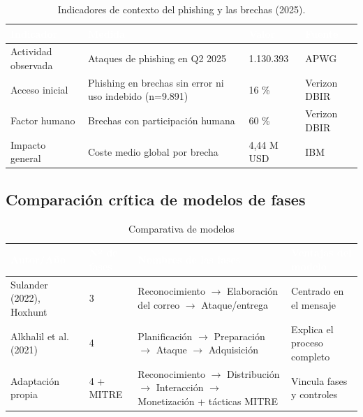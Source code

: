 \documentclass[11pt,a4paper,oneside]{report}
\begin{document}
\begingroup
\begin{table}[H]
  \centering
  \small
  \caption{Indicadores de contexto del phishing y las brechas (2025).}
  \label{tab:2-1}
  \begin{tabularx}{\textwidth}{|X|X|X|X|}
    \hline
    \rowcolor{uemcgreen}
    \textcolor{white}{\textbf{Indicador}} & \textcolor{white}{\textbf{Medida}} & \textcolor{white}{\textbf{Valor}} & \textcolor{white}{\textbf{Fuente}} \\
    \hline
    Actividad observada & Ataques de phishing en Q2 2025 & 1.130.393 & APWG \\
    \hline
    \rowcolor{tablelight}
    Acceso inicial & Phishing en brechas sin error ni uso indebido (n=9.891) & 16 \% & Verizon DBIR \\
    \hline
    Factor humano & Brechas con participación humana & 60 \% & Verizon DBIR \\
    \hline
    \rowcolor{tablelight}
    Impacto general & Coste medio global por brecha & 4,44 M USD & IBM \\
    \hline
  \end{tabularx}
\end{table}
\endgroup

\subsection{Comparación crítica de modelos de fases}

\begingroup
\begin{table}[H]
  \centering
  \small
  \caption{Comparativa de modelos}
  \label{tab:2-2}
  \begin{tabularx}{\textwidth}{|X|X|X|X|}
    \hline
    \rowcolor{uemcgreen}
    \textcolor{white}{\textbf{Autor/Año}} & \textcolor{white}{\textbf{Nº de fases}} & \textcolor{white}{\textbf{Nombres de las fases}} & \textcolor{white}{\textbf{Ventajas del modelo}} \\
    \hline
    Sulander (2022), Hoxhunt & 3 & Reconocimiento \(\rightarrow\) Elaboración del correo \(\rightarrow\) Ataque/entrega & Centrado en el mensaje \\
    \hline
    \rowcolor{tablelight}
    Alkhalil et al. (2021) & 4 & Planificación \(\rightarrow\) Preparación \(\rightarrow\) Ataque \(\rightarrow\) Adquisición & Explica el proceso completo \\
    \hline
    Adaptación propia & 4 + MITRE & Reconocimiento \(\rightarrow\) Distribución \(\rightarrow\) Interacción \(\rightarrow\) Monetización + tácticas MITRE & Vincula fases y controles \\
    \hline
  \end{tabularx}
\end{table}
\endgroup
\end{document}
